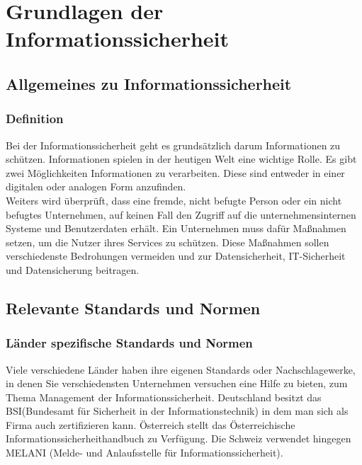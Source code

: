 \chapter{Grundlagen der Informationssicherheit}
\strahlhofer

\section{Allgemeines zu Informationssicherheit}
\subsection{Definition}
Bei der Informationssicherheit geht es grundsätzlich darum Informationen zu schützen. Informationen spielen in der heutigen Welt eine wichtige Rolle. Es gibt zwei Möglichkeiten Informationen zu verarbeiten. Diese sind entweder in einer digitalen oder analogen Form anzufinden.
\\
Weiters wird überprüft, dass eine fremde, nicht befugte Person oder ein nicht befugtes Unternehmen, auf keinen Fall den Zugriff auf die unternehmensinternen Systeme und Benutzerdaten erhält. Ein Unternehmen muss dafür Maßnahmen setzen, um die Nutzer ihres Services zu schützen. Diese Maßnahmen sollen verschiedenste Bedrohungen vermeiden und zur Datensicherheit, IT-Sicherheit und Datensicherung beitragen.
\\

\section{Relevante Standards und Normen}

\subsection{Länder spezifische Standards und Normen}
Viele verschiedene Länder haben ihre eigenen Standards oder Nachschlagewerke, in denen Sie verschiedensten Unternehmen versuchen eine Hilfe zu bieten, zum Thema Management der Informationssicherheit.
Deutschland besitzt das BSI(Bundesamt für Sicherheit in der Informationstechnik) in dem man sich als Firma auch zertifizieren kann. Österreich stellt das Österreichische Informationssicherheithandbuch zu Verfügung. Die Schweiz verwendet hingegen MELANI (Melde- und Anlaufsstelle für Informationssicherheit).


